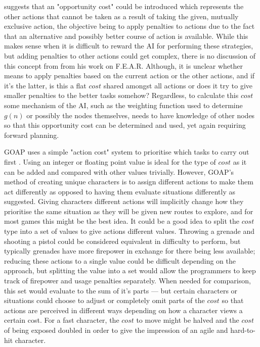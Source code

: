 \documentclass[11pt, a4paper]{report}
\begin{document}
\citeauthor{harmon2002economic} \parencite*[405]{harmon2002economic} suggests that an "opportunity cost" could be introduced which represents the other actions that cannot be taken as a result of taking the given, mutually exclusive action, the objective being to apply penalties to actions due to the fact that an alternative and possibly better course of action is available. While this makes sense when it is difficult to reward the AI for performing these strategies, but adding penalties to other actions could get complex, there is no discussion of this concept from \citeauthor{orkin2006three} \parencite*{orkin2006three} from his work on F.E.A.R. Although, it is unclear whether \citeauthor{harmon2002economic} means to apply penalties based on the current action or the other actions, and if it's the latter, is this a flat $cost$ shared amongst all actions or does it try to give smaller penalties to the better tasks somehow? Regardless, to calculate this $cost$ some mechanism of the AI, such as the weighting function used to determine $g(n)$ or possibly the nodes themselves, needs to have knowledge of other nodes so that this opportunity cost can be determined and used, yet again requiring forward planning.

GOAP uses a simple "action cost" system to prioritise which tasks to carry out first \parencite[11]{orkin2006three}. Using an integer or floating point value is ideal for the type of $cost$ as it can be added and compared with other values trivially. However, GOAP's method of creating unique characters is to assign different actions to make them act differently \parencite[8]{orkin2006three} as opposed to having them evaluate situations differently as \citeauthor{millington2019ai} \parencite*{millington2019ai} suggested. Giving characters different actions will implicitly change how they prioritise the same situation as they will be given new routes to explore, and for most games this might be the best idea. It could be a good idea to split the $cost$ type into a set of values to give actions different values. Throwing a grenade and shooting a pistol could be considered equivalent in difficulty to perform, but typically grenades have more firepower in exchange for there being less available; reducing these actions to a single value could be difficult depending on the approach, but splitting the value into a set would allow the programmers to keep track of firepower and usage penalties separately. When needed for comparison, this set would evaluate to the sum of it's parts --- but certain characters or situations could choose to adjust or completely omit parts of the $cost$ so that actions are perceived in different ways depending on how a character views a certain cost. For a fast character, the $cost$ to move might be halved and the $cost$ of being exposed doubled in order to give the impression of an agile and hard-to-hit character.
\end{document}
